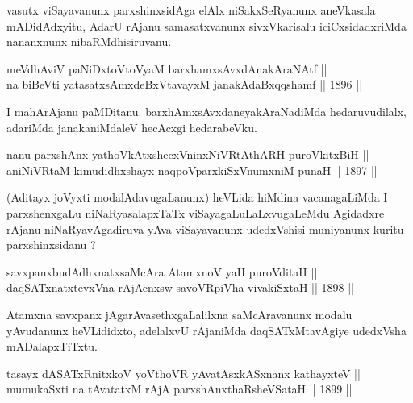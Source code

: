 \begin{artha}
vasutx viSayavanunx parxshinxsidAga elAlx niSakxSeRyanunx aneVkasala
mADidAdxyitu, AdarU rAjanu samasatxvanunx sivxVkarisalu
iciCxsidadxriMda nananxnunx nibaRMdhisiruvanu.
\end{artha}

\begin{shl}
meVdhAviV paNiDxtoV\s toV\s yaM barxhamxsAvxdAnakAraNAtf || \\
na biBeVti yatasatxsAmxdeBxVtavayxM janakAdaBxqqshamf \hfill || 1896 ||
  
\end{shl}

\begin{artha}
I mahArAjanu paMDitanu. barxhAmxsAvxdaneyakAraNadiMda hedaruvudilalx,
adariMda janakaniMdaleV hecAcxgi hedarabeVku.
\end{artha}


\begin{shl}
nanu parxshAnx yathoVkAtxshecxVninxNiVRtAthARH puroVkitxBiH || \\
aniNiVRtaM kimudidhxshayx naqpoV\s parxkiSxVnumxniM punaH \hfill || 1897 ||
  
\end{shl} 

\begin{artha}
(Aditayx joVyxti modalAdavugaLanunx) heVLida hiMdina vacanagaLiMda I
parxshenxgaLu niNaRyasalapxTaTx viSayagaLuLaLxvugaLeMdu Agidadxre
rAjanu niNaRyavAgadiruva yAva viSayavanunx udedxVshisi muniyanunx
kuritu parxshinxsidanu ?
\end{artha}


\begin{shl}
savxpanxbudAdhxnatxsaMcAra AtamxnoV yaH puroVditaH || \\
daqSATxnatxtevxVna rAjAcnx\s sw savoVR\s piVha vivakiSxtaH \hfill || 1898 ||
  
\end{shl}

\begin{artha}
Atamxna savxpanx jAgarAvasethxgaLalilxna saMcAravanunx modalu
yAvudanunx heVLididxto, adelalxvU rAjaniMda daqSATxMtavAgiye udedxVsha
mADalapxTiTxtu.
\end{artha}


\begin{shl}
tasayx dASATxRnitxkoV yoV\s thoVR yAvatAsxkASxnanx kathayxteV || \\
mumukaSxti na tAvatatxM rAjA parxshAnxthaRsheVSataH \hfill || 1899 ||
  
\end{shl}

